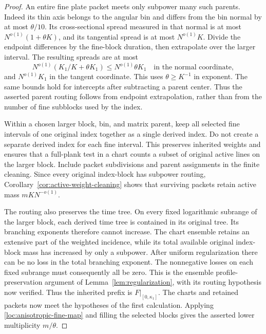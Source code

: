 \begin{proof}
An entire fine plate packet meets only subpower many such parents.
Indeed its thin axis belongs to the angular bin and differs from
the bin normal by at most $\theta/10$.  Its cross-sectional spread measured in that
normal is at most $N^{o(1)}(1+\theta K)$, and its tangential spread
is at most $N^{o(1)}K$.  Divide the endpoint differences by the
fine-block duration, then extrapolate over the larger interval.
The resulting spreads are at most
\[
 N^{o(1)}(K_1/K+\theta K_1)
       \leq N^{o(1)}\theta K_1
 \quad\text{in the normal coordinate},
\]
and $N^{o(1)}K_1$ in the tangent coordinate.  This uses
$\theta\geq K^{-1}$ in exponent.  The same bounds hold for
intercepts after subtracting a parent center.  Thus the asserted
parent routing follows from endpoint extrapolation, rather than
from the number of fine subblocks used by the index.

Within a chosen larger block, bin, and matrix parent, keep all
selected fine intervals of one original index together as a single
derived index.  Do not create a separate derived index for each
fine interval.  This preserves inherited weights and ensures that
a full-plank test in a chart counts a subset of original active
lines on the larger block.  Include packet subdivisions and parent
assignments in the finite cleaning.  Since every original
index-block has subpower routing, Corollary~\ref{cor:active-weight-cleaning}
shows that surviving packets retain active mass $mKN^{-o(1)}$.

The routing also preserves the time tree.  On every fixed logarithmic
subrange of the larger block, each derived time tree is contained in its original tree.  Its branching
exponents therefore cannot increase.  The chart ensemble retains
an extensive part of the weighted incidence, while its total
available original index-block mass has increased by only a
subpower.  After uniform regularization there can be no loss in
the total branching exponent.  The nonnegative losses on each
fixed subrange must consequently all be zero.  This is the
ensemble profile-preservation argument of
Lemma~\ref{lem:regularization}, with its routing hypothesis now
verified.  Thus the inherited prefix is $F|_{[0,\kappa_1]}$.
The charts and retained packets now meet the hypotheses of the first
calculation.  Applying \eqref{loc:anisotropic-fine-map} and filling
the selected blocks gives the asserted lower multiplicity $m/\theta$.


\end{proof}
